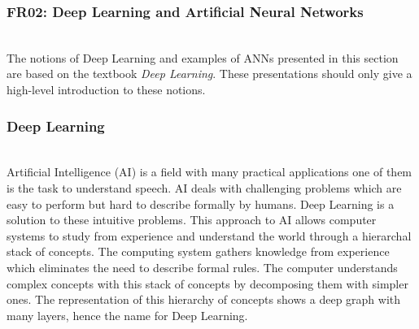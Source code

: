 
\subsubsection{FR02: Deep Learning and Artificial Neural Networks}\label{ann}~\\

The notions of Deep Learning and examples of ANNs presented in this section are
based on the textbook \textit{Deep Learning}\cite{Goodfellow-et-al-2016}. These
presentations should only give a high-level introduction to these notions.

\subsubsection{Deep Learning}~\\


Artificial Intelligence (AI) is a field with many practical applications one of
them is the task to understand speech. AI deals with challenging problems which
are easy to perform but hard to describe formally by humans. Deep Learning is a
solution to these intuitive problems. This approach to AI allows computer
systems to study from experience and understand the world through a hierarchal
stack of concepts.  The computing system gathers knowledge from experience which
eliminates the need to describe formal rules. The computer understands complex
concepts with this stack of concepts by decomposing them with simpler ones. The
representation of this hierarchy of concepts shows a deep graph with many
layers, hence the name for Deep Learning.~\cite{Goodfellow-et-al-2016}

